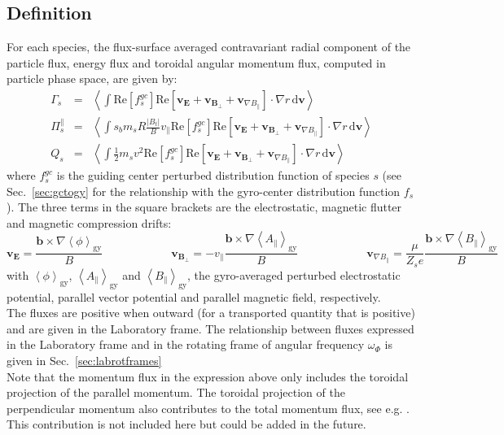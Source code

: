 \documentclass[a4paper]{report}
\begin{document}
\subsection{Definition}
For each species, the flux-surface averaged contravariant radial component of the particle flux, energy flux and toroidal angular momentum flux, computed in particle phase space, are given by:
\begin{eqnarray}
 \Gamma_s &=& \left<\int \textrm{Re}\left[f_s^{gc}\right] \textrm{Re}\left[\mathbf{v}_\mathbf{E} + \mathbf{v}_{\mathbf{B}_\perp} + \mathbf{v}_{\nabla B_\parallel}  \right]\cdot \nabla r\,\textrm{d}\mathbf{v}\right> \\
  \Pi^\parallel_s   &=& \left<\int s_b m_s R \frac{|B_t|}{B}v_\parallel \textrm{Re}\left[f_s^{gc}\right] \textrm{Re}  \left[\mathbf{v}_\mathbf{E} + \mathbf{v}_{\mathbf{B}_\perp} + \mathbf{v}_{\nabla B_\parallel}  \right] \cdot \nabla r\,\textrm{d}\mathbf{v}\right> \\
      Q_s &=& \left<\int \frac{1}{2}m_sv^2 \textrm{Re}\left[f_s^{gc}\right] \textrm{Re} \left[\mathbf{v}_\mathbf{E} + \mathbf{v}_{\mathbf{B}_\perp} + \mathbf{v}_{\nabla B_\parallel}  \right] \cdot \nabla r\,\textrm{d}\mathbf{v}\right> 
\end{eqnarray}
where $f_s^{gc}$ is the guiding center perturbed distribution function of species $s$ (see Sec.~\ref{sec:gctogy} for the relationship with the gyro-center distribution function $f_s$). The three terms in the square brackets are the electrostatic, magnetic flutter and magnetic compression drifts:
\begin{equation}
 \mathbf{v}_\mathbf{E} = \frac{\mathbf{b}\times \nabla \left<\phi\right>_\textrm{gy} }{B} \qquad \qquad \qquad
 \mathbf{v}_{\mathbf{B}_\perp} = -v_\parallel \frac{\mathbf{b}\times \nabla \left<A_{\parallel}\right>_\textrm{gy}}{B}  \qquad \qquad \qquad
 \mathbf{v}_{\nabla B_\parallel} = \frac{\mu}{Z_s e} \frac{\mathbf{b}\times \nabla \left<B_{\parallel}\right>_\textrm{gy}}{B}
\end{equation}
with $\left<\phi\right>_\textrm{gy}$, $\left<A_{\parallel}\right>_\textrm{gy}$ and $\left<B_{\parallel}\right>_\textrm{gy}$, the gyro-averaged perturbed electrostatic potential, parallel vector potential and parallel magnetic field, respectively. \\
The fluxes are positive when outward (for a transported quantity that is positive) and are given in the Laboratory frame. The relationship between fluxes expressed in the Laboratory frame and in the rotating frame of angular frequency $\omega_\Phi$ is given in Sec.~\ref{sec:labrotframes}\\
Note that the momentum flux in the expression above only includes the toroidal projection of the parallel momentum. The toroidal projection of the perpendicular momentum also contributes to the total momentum flux, see e.g. \cite{Scott:PoP2010}. This contribution is not included here but could be added in the future. 
\end{document}
